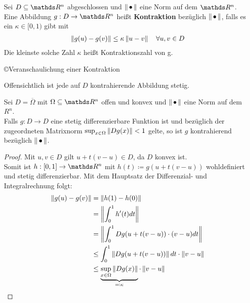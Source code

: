 \begin{Defe}
  Sei $D\subseteq  \R^n $ abgeschlossen und $\nn$ eine Norm auf dem $\R^n$.
  Eine Abbildung $g:D\rightarrow \R^n $ heißt \textbf{Kontraktion} bezüglich  $\nn$,
  falls es ein $\kappa \in [0,1)$ gibt mit
  \begin{gather*}
    \nn[g(u)-g(v)] \leq \kappa \nn[u-v] \quad \forall u,v\in D
  \end{gather*}
  Die kleinste solche Zahl $\kappa$ heißt Kontraktionszahl von g.
  
  \begin{image}{\copyright Veranschaulichung einer Kontraktion}
  \end{image}
  \label{im5.2.2}

  
  Offensichtlich ist jede auf $D$ kontrahierende Abbildung stetig.
\end{Defe}  

\begin{Leme}
  \label{5.2.3}
  Sei $D=\overline{\Omega} $ mit $\Omega \subseteq \R^n$ offen und konvex
  und $\nn$ eine Norm auf dem $R^n$.\\
  Falls $g:D\to D$ eine stetig differenzierbare Funktion ist und
  bezüglich der zugeordneten Matrixnorm $\sup_{x\in \Omega}\nn[Dg(x)]<1$ gelte,
  so ist $g$ kontrahierend bezüglich  $\nn$.
\end{Leme} 

\begin{proof}
  Mit $u,v \in D$ gilt $u+t(v-u)\in D$, da $D$ konvex ist. \\
  Somit ist $h:[0,1]\rightarrow \R^n $ mit $h(t) \coloneqq g(u+t(v-u))$ wohldefiniert
  und stetig differenzierbar. Mit dem Hauptsatz der Differenzial- und Integralrechnung
  folgt:
  \begin{align}\nonumber
    \nn[g(u)-g(v)] & = \nn[h(1)-h(0)]  \\ \nonumber
                   & = \nn[\int_{0}^{1} h'(t) dt] \\ \nonumber
                   & = \nn[\int_{0}^{1} Dg(u+t(v-u))\cdot (v-u)dt] \\ \nonumber
                   & \leq \int_{0}^{1} \nn[Dg(u+t(v-u))]dt \cdot \nn[v-u] \\
                   & \leq \underbrace{\sup_{x\in\Omega}\nn[Dg(x)]}_{\eqqcolon \kappa} 
                     \cdot \nn[v-u]
                     \label{V.2.4}
  \end{align}
\end{proof}


